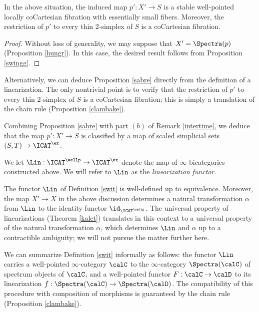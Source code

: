 \begin{proposition}\label{sabre}
In the above situation, the induced map $p': X' \rightarrow S$ is a stable well-pointed
locally coCartesian fibration with essentially small fibers. Moreover, the
restriction of $p'$ to every thin $2$-simplex of $S$ is a coCartesian fibration.
\end{proposition}

\begin{proof}
Without loss of generality, we may suppose that $X' = \Spectra(p)$ (Proposition
\ref{hungr}). In this case, the desired result follows from Proposition \ref{swingg}.
\end{proof}

\begin{remark}
Alternatively, we can deduce Proposition \ref{sabre} directly from the definition
of a linearization. The only nontrivial point is to verify that the restriction
of $p'$ to every thin $2$-simplex of $S$ is a coCartesian fibration; this is simply
a translation of the chain rule (Proposition \ref{clambake}). 
\end{remark}

Combining Proposition \ref{sabre} with part $(b)$ of Remark \ref{intertime}, we deduce that 
the map $p': X' \rightarrow S$ is classified by a map of scaled simplicial sets $(S,T) \rightarrow \ICAT^{\ex}$.

\begin{definition}\label{swit}
We let $\Lin: \ICAT^{\wellp} \rightarrow \ICAT^{\ex}$ denote the map of $\infty$-bicategories constructed above. We will refer to $\Lin$ as the {\it linearization functor}.
\end{definition}

\begin{remark}
The functor $\Lin$ of Definition \ref{swit} is well-defined up to equivalence. 
Moreover, the map $X' \rightarrow X$ in the above discussion determines a natural
transformation $\alpha$ from $\Lin$ to the identity functor $\id_{ \ICAT^{\wellp} }$. The universal
property of linearizations (Theorem \ref{kalet}) translates in this context to a universal
property of the natural transformation $\alpha$, which determines $\Lin$
and $\alpha$ up to a contractible ambiguity; we will not pursue the matter further here.
\end{remark}

\begin{remark}
We can summarize Definition \ref{swit} informally as follows: the functor
$\Lin$ carries a well-pointed $\infty$-category $\calC$ to the $\infty$-category
$\Spectra(\calC)$ of spectrum objects of $\calC$, and a well-pointed functor
$F: \calC \rightarrow \calD$ to its linearization $f: \Spectra(\calC) \rightarrow \Spectra(\calD)$.
The compatibility of this procedure with composition of morphisms is guaranteed by
the chain rule (Proposition \ref{clambake}).
\end{remark}

